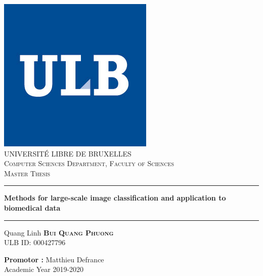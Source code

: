 \documentclass[11pt, openany]{report}
\theoremstyle{plain}
\theoremstyle{definition}
\theoremstyle{remark}
\begin{document}
\begin{titlepage}
  \begin{sffamily}
  \begin{center}

    \includegraphics[scale=0.4]{figures/logo_ulb.jpg}~\\[1cm]
    
	\textsc{\LARGE UNIVERSITÉ LIBRE DE BRUXELLES}\\[0.5cm]
    \textsc{\LARGE Computer Sciences Department, Faculty of Sciences}\\[2cm]
    \textsc{\LARGE Master Thesis}\\[2cm]

    \hrule width 15cm
    \vspace{0.5cm}
    { \huge \bfseries Methods for large-scale image classification and application to biomedical data}
    \vspace{0.5cm}
	\hrule width 15cm
	\vspace{1cm}
	
	
	\LARGE Quang Linh \textsc{\textbf{\LARGE Bui Quang Phuong}} \\ [0.5cm]
	\large ULB ID: 000427796 
	
    \vfill

    {\large \textbf{Promotor :} Matthieu Defrance} \\
    \vspace{0.5cm}
    Academic Year 2019-2020

  \end{center}
  \end{sffamily}
\end{titlepage}
\end{document}
